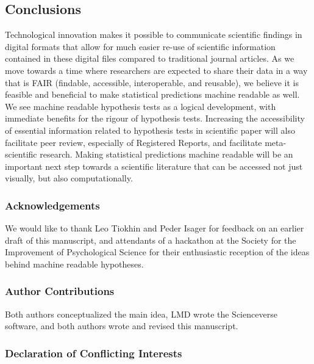 \documentclass[doc,floatsintext]{apa6}
\begin{document}
\hypertarget{conclusions}{%
\subsection{Conclusions}\label{conclusions}}

Technological innovation makes it possible to communicate scientific findings in digital formats that allow for much easier re-use of scientific information contained in these digital files compared to traditional journal articles. As we move towards a time where researchers are expected to share their data in a way that is FAIR (findable, accessible, interoperable, and reusable), we believe it is feasible and beneficial to make statistical predictions machine readable as well. We see machine readable hypothesis tests as a logical development, with immediate benefits for the rigour of hypothesis tests. Increasing the accessibility of essential information related to hypothesis tests in scientific paper will also facilitate peer review, especially of Registered Reports, and facilitate meta-scientific research. Making statistical predictions machine readable will be an important next step towards a scientific literature that can be accessed not just visually, but also computationally.

\newpage

\hypertarget{acknowledgements}{%
\subsubsection{Acknowledgements}\label{acknowledgements}}

We would like to thank Leo Tiokhin and Peder Isager for feedback on an earlier draft of this manuscript, and attendants of a hackathon at the Society for the Improvement of Psychological Science for their enthusiastic reception of the ideas behind machine readable hypotheses.

\hypertarget{author-contributions}{%
\subsubsection{Author Contributions}\label{author-contributions}}

Both authors conceptualized the main idea, LMD wrote the Scienceverse software, and both authors wrote and revised this manuscript.

\hypertarget{declaration-of-conflicting-interests}{%
\subsubsection{Declaration of Conflicting Interests}\label{declaration-of-conflicting-interests}}
\end{document}
